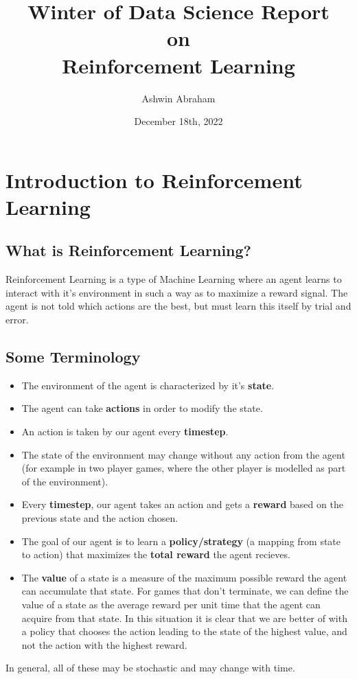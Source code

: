 \documentclass[12pt]{report}
\title{\Huge \textbf{Winter of Data Science Report} \\ on \\ \textbf{Reinforcement Learning}}
\author{\Large Ashwin Abraham}
\date{\Large December 18th, 2022}
\begin{document}
\begin{titlepage}
    \maketitle
\end{titlepage}

\tableofcontents
\newpage

\chapter{Introduction to Reinforcement Learning}
\section{What is Reinforcement Learning?}
Reinforcement Learning is a type of Machine Learning where an agent learns to interact with it's environment in such a way as to maximize a reward signal.
The agent is not told which actions are the best, but must learn this itself by trial and error.

\section{Some Terminology}
\begin{itemize}
    \item The environment of the agent is characterized by it's \textbf{state}.
    \item The agent can take \textbf{actions} in order to modify the state.
    \item An action is taken by our agent every \textbf{timestep}.
    \item The state of the environment may change without any action from the agent (for example in two player games, where the other player is modelled as part of the environment).
    \item Every \textbf{timestep}, our agent takes an action and gets a \textbf{reward} based on the previous state and the action chosen.
    \item The goal of our agent is to learn a \textbf{policy/strategy} (a mapping from state to action) that maximizes the \textbf{total reward} the agent recieves.
    \item The \textbf{value} of a state is a measure of the maximum possible reward the agent can accumulate that state. For games that don't terminate, we can
    define the value of a state as the average reward per unit time that the agent can acquire from that state. In this situation it is clear that we are better of with a policy that chooses the 
    action leading to the state of the highest value, and not the action with the highest reward.
\end{itemize}
In general, all of these may be stochastic and may change with time.
\end{document}
